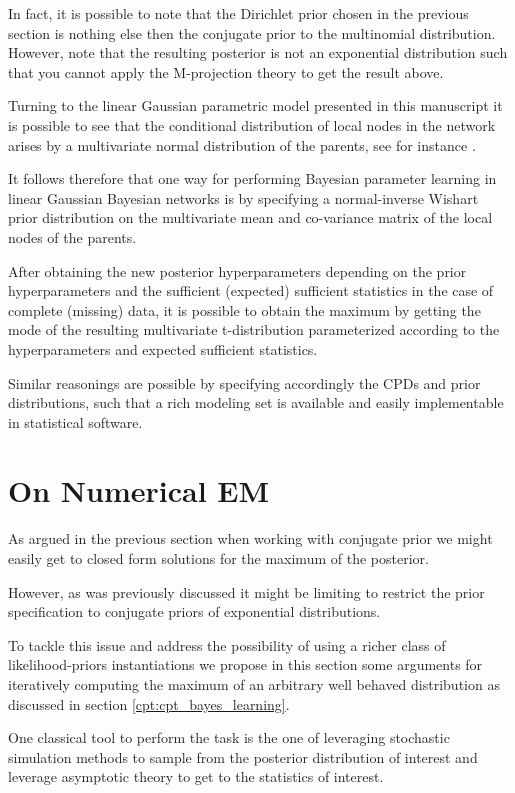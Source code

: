 \documentclass[11pt]{article}
\begin{document}
\begin{article}
In fact, it is possible to note that the Dirichlet prior chosen in
the previous section is nothing else then the conjugate prior to
the multinomial distribution. However, note that the resulting
posterior is not an exponential distribution such that you cannot
apply the M-projection theory to get the result above.

Turning to the linear Gaussian parametric model presented in this
manuscript it is possible to see that the conditional distribution
of local nodes in the network arises by a multivariate normal
distribution of the parents, see for instance
\cite{koller2009probabilistic}.

It follows therefore that one way for performing Bayesian parameter
learning in linear Gaussian Bayesian networks is by specifying a
normal-inverse Wishart prior distribution on the multivariate mean
and co-variance matrix of the local nodes of the parents.

After obtaining the new posterior hyperparameters depending on the
prior hyperparameters and the sufficient (expected) sufficient
statistics in the case of complete (missing) data, it is possible
to obtain the maximum by getting the mode of the resulting
multivariate t-distribution parameterized according to the
hyperparameters and expected sufficient statistics.

Similar reasonings are possible by specifying accordingly the CPDs
and prior distributions, such that a rich modeling set is
available and easily implementable in statistical software.

\newpage

\section{On Numerical EM}
\label{numerical-em}
As argued in the previous section when working with conjugate prior
we might easily get to closed form solutions for the maximum of the
posterior.

However, as was previously discussed it might be limiting to
restrict the prior specification to conjugate priors of exponential
distributions.

To tackle this issue and address the possibility of using a richer
class of likelihood-priors instantiations we propose in this
section some arguments for iteratively computing the maximum of an
arbitrary well behaved distribution as discussed in section
\ref{cpt:cpt_bayes_learning}.

One classical tool to perform the task is the one of leveraging
stochastic simulation methods to sample from the posterior
distribution of interest and leverage asymptotic theory to get to
the statistics of interest.


\end{article}
\end{document}
